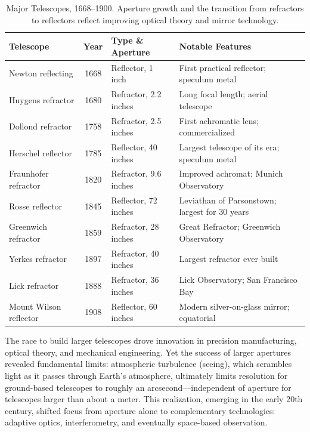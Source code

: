 \begin{table}[ht]
\centering
\begin{tabularx}{\textwidth}{>{\raggedright\arraybackslash}X c >{\raggedright\arraybackslash}X >{\raggedright\arraybackslash}X}
\toprule
\textbf{Telescope} & \textbf{Year} & \textbf{Type \& Aperture} & \textbf{Notable Features} \\
\midrule
Newton reflecting & 1668 & Reflector, 1 inch & First practical reflector; speculum metal \\
Huygens refractor & 1680 & Refractor, 2.2 inches & Long focal length; aerial telescope \\
Dollond refractor & 1758 & Refractor, 2.5 inches & First achromatic lens; commercialized \\
Herschel reflector & 1785 & Reflector, 40 inches & Largest telescope of its era; speculum metal \\
Fraunhofer refractor & 1820 & Refractor, 9.6 inches & Improved achromat; Munich Observatory \\
Rosse reflector & 1845 & Reflector, 72 inches & Leviathan of Parsonstown; largest for 30 years \\
Greenwich refractor & 1859 & Refractor, 28 inches & Great Refractor; Greenwich Observatory \\
Yerkes refractor & 1897 & Refractor, 40 inches & Largest refractor ever built \\
Lick refractor & 1888 & Refractor, 36 inches & Lick Observatory; San Francisco Bay \\
Mount Wilson reflector & 1908 & Reflector, 60 inches & Modern silver-on-glass mirror; equatorial \\
\bottomrule
\end{tabularx}
\caption{Major Telescopes, 1668–1900. Aperture growth and the transition from refractors to reflectors reflect improving optical theory and mirror technology.}
\label{tab:telescope-apertures}
\end{table}

The race to build larger telescopes drove innovation in precision manufacturing, optical theory, and mechanical engineering. Yet the success of larger apertures revealed fundamental limits: atmospheric turbulence (seeing), which scrambles light as it passes through Earth's atmosphere, ultimately limits resolution for ground-based telescopes to roughly an arcsecond—independent of aperture for telescopes larger than about a meter. This realization, emerging in the early 20th century, shifted focus from aperture alone to complementary technologies: adaptive optics, interferometry, and eventually space-based observation.

